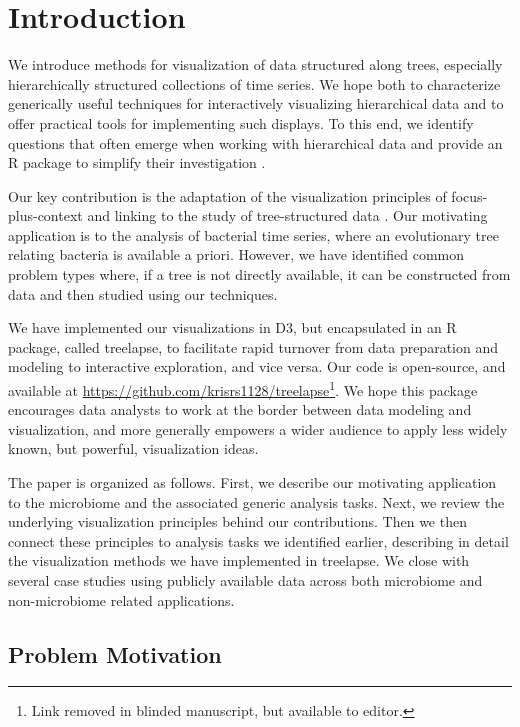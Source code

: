 \documentclass[12pt]{article}
\begin{document}
\newpage
{} %

\section{Introduction}\label{introduction}

We introduce methods for visualization of data structured along trees,
especially hierarchically structured collections of time series. We hope
both to characterize generically useful techniques for interactively
visualizing hierarchical data and to offer practical tools for
implementing such displays. To this end, we identify questions that
often emerge when working with hierarchical data and provide an R
package to simplify their investigation \citep{ihaka1996r}.

Our key contribution is the adaptation of the visualization principles
of focus-plus-context and linking to the study of tree-structured data
\citep{buja1996interactive, becker1987brushing}. Our motivating
application is to the analysis of bacterial time series, where an
evolutionary tree relating bacteria is available a priori. However, we
have identified common problem types where, if a tree is not directly
available, it can be constructed from data and then studied using our
techniques.

We have implemented our visualizations in D3, but encapsulated in an R
package, called treelapse, to facilitate rapid turnover from data
preparation and modeling to interactive exploration, and vice versa. Our
code is open-source, and available at
\url{https://github.com/krisrs1128/treelapse}\footnote{Link removed in blinded manuscript,
but available to editor.}. We hope this package encourages data analysts
to work at the border between data modeling and visualization, and more
generally empowers a wider audience to apply less widely known, but
powerful, visualization ideas.

The paper is organized as follows. First, we describe our motivating
application to the microbiome and the associated generic analysis tasks.
Next, we review the underlying visualization principles behind our
contributions. Then we then connect these principles to analysis tasks
we identified earlier, describing in detail the visualization methods we
have implemented in treelapse. We close with several case studies using
publicly available data across both microbiome and non-microbiome
related applications.

\subsection{Problem Motivation}\label{problem-motivation}
\end{document}
